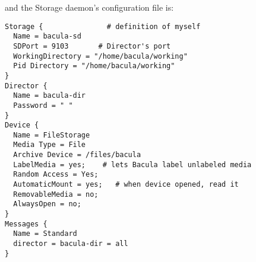 and the Storage daemon's configuration file is: 

\footnotesize
\begin{verbatim}
Storage {               # definition of myself
  Name = bacula-sd
  SDPort = 9103       # Director's port
  WorkingDirectory = "/home/bacula/working"
  Pid Directory = "/home/bacula/working"
}
Director {
  Name = bacula-dir
  Password = " "
}
Device {
  Name = FileStorage
  Media Type = File
  Archive Device = /files/bacula
  LabelMedia = yes;    # lets Bacula label unlabeled media
  Random Access = Yes;
  AutomaticMount = yes;   # when device opened, read it
  RemovableMedia = no;
  AlwaysOpen = no;
}
Messages {
  Name = Standard
  director = bacula-dir = all
}
\end{verbatim}
\normalsize

